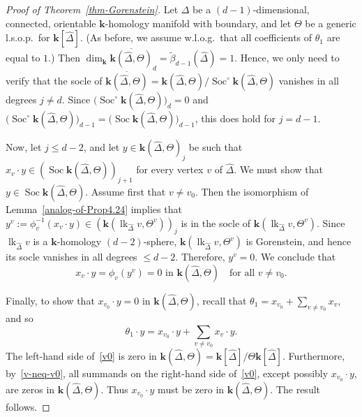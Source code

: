 \documentclass[10pt]{amsart}
\theoremstyle{definition}
\DeclareMathOperator\lk{lk}
\DeclareMathOperator{\Soc}{Soc}
\newcommand{\complet}[1]{\hat{#1}}
\newcommand{\field}{\mathbf{k}}
\begin{document}
\begin{proof}[Proof of Theorem~\ref{thm-Gorenstein}]
Let $\Delta$ be a $(d-1)$-dimensional, connected, orientable $\field$-homology manifold with boundary, and let $\Theta$ be a generic l.s.o.p.~for $\field[\complet{\Delta}]$. (As before, we assume w.l.o.g.~that all coefficients of $\theta_1$ are equal to $1$.) Then $\dim_\field \overline{\field(\complet{\Delta},\Theta)}_d =\tilde{\beta}_{d-1}(\complet{\Delta})=1$. Hence, we only need to verify that the socle of $\overline{\field(\complet{\Delta},\Theta)}=\field(\complet{\Delta},\Theta)/\Soc^\circ \field(\complet{\Delta},\Theta)$ vanishes in all degrees $j\neq d$. Since $\big(\Soc^\circ \field(\complet{\Delta},\Theta)\big)_d=0$ and $\big(\Soc^\circ \field(\complet{\Delta},\Theta)\big)_{d-1}=\big(\Soc \field(\complet{\Delta},\Theta)\big)_{d-1}$, this does hold for $j=d-1$.

Now, let $j\leq d-2$, and let $y\in \field(\complet{\Delta},\Theta)_j$ be such that $x_v\cdot y\in (\Soc \field(\complet{\Delta},\Theta))_{j+1}$ for every vertex $v$ of $\complet{\Delta}$. We must show that $y\in \Soc \field(\complet{\Delta},\Theta)$. Assume first that $v\neq v_0$. Then the isomorphism of Lemma~\ref{analog-of-Prop4.24} implies that $y^v:=\phi_v^{-1}(x_v\cdot y)\in (\field(\lk_{\complet{\Delta}}v, \Theta^v))_j$ is in the socle of $\field(\lk_{\complet{\Delta}}v, \Theta^v)$. Since $\lk_{\complet{\Delta}}v$ is a $\field$-homology $(d-2)$-sphere, $\field(\lk_{\complet{\Delta}}v, \Theta^v)$ is Gorenstein, and hence its socle vanishes in all degrees $\leq d-2$. Therefore, $y^v=0$. We conclude that
\begin{equation} \label{v-neq-v0}
x_v\cdot y=\phi_v(y^v)=0 \mbox{ in } \field(\complet{\Delta},\Theta) \quad \mbox{for all } v\neq v_0.
\end{equation}

Finally, to show that $x_{v_0}\cdot y=0$ in $\field(\complet{\Delta},\Theta)$, recall that $\theta_1=x_{v_0}+\sum_{v\neq v_0}x_v$, and so
\begin{equation} \label{v0}
\theta_1\cdot y=x_{v_0}\cdot y + \sum_{v\neq v_0} x_v\cdot y.
\end{equation}
The left-hand side of~\eqref{v0} is zero in $\field(\complet{\Delta},\Theta)=\field[\complet{\Delta}]/\Theta\field[\complet{\Delta}]$. Furthermore, by~\eqref{v-neq-v0}, all summands on the right-hand side of~\eqref{v0}, except possibly $x_{v_0}\cdot y$, are zeros in $\field(\complet{\Delta},\Theta)$. Thus $x_{v_0}\cdot y$ must be zero in $\field(\complet{\Delta},\Theta)$. The result follows. 
\end{proof}
\end{document}
